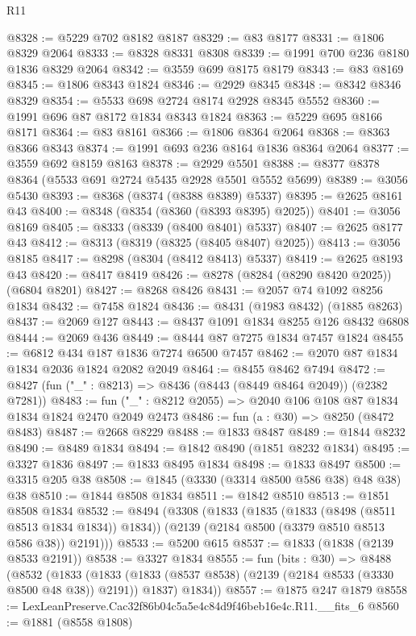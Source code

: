 \begin{lexlean}{R11}
\begin{coremodule}
@8328 := @5229 @702 @8182 @8187
@8329 := @83 @8177
@8331 := @1806 @8329 @2064
@8333 := @8328 @8331 @8308
@8339 := @1991 @700 @236 @8180 @1836 @8329 @2064
@8342 := @3559 @699 @8175 @8179
@8343 := @83 @8169
@8345 := @1806 @8343 @1824
@8346 := @2929 @8345
@8348 := @8342 @8346 @8329
@8354 := @5533 @698 @2724 @8174 @2928 @8345 @5552
@8360 := @1991 @696 @87 @8172 @1834 @8343 @1824
@8363 := @5229 @695 @8166 @8171
@8364 := @83 @8161
@8366 := @1806 @8364 @2064
@8368 := @8363 @8366 @8343
@8374 := @1991 @693 @236 @8164 @1836 @8364 @2064
@8377 := @3559 @692 @8159 @8163
@8378 := @2929 @5501
@8388 := @8377 @8378 @8364 (@5533 @691 @2724 @5435 @2928 @5501 @5552 @5699)
@8389 := @3056 @5430
@8393 := @8368 (@8374 (@8388 @8389) @5337)
@8395 := @2625 @8161 @43
@8400 := @8348 (@8354 (@8360 (@8393 @8395) @2025))
@8401 := @3056 @8169
@8405 := @8333 (@8339 (@8400 @8401) @5337)
@8407 := @2625 @8177 @43
@8412 := @8313 (@8319 (@8325 (@8405 @8407) @2025))
@8413 := @3056 @8185
@8417 := @8298 (@8304 (@8412 @8413) @5337)
@8419 := @2625 @8193 @43
@8420 := @8417 @8419
@8426 := @8278 (@8284 (@8290 @8420 @2025)) (@6804 @8201)
@8427 := @8268 @8426
@8431 := @2057 @74 @1092 @8256 @1834
@8432 := @7458 @1824
@8436 := @8431 (@1983 @8432) (@1885 @8263)
@8437 := @2069 @127
@8443 := @8437 @1091 @1834 @8255 @126 @8432 @6808
@8444 := @2069 @436
@8449 := @8444 @87 @7275 @1834 @7457 @1824
@8455 := @6812 @434 @187 @1836 @7274 @6500 @7457
@8462 := @2070 @87 @1834 @1834 @2036 @1824 @2082 @2049
@8464 := @8455 @8462 @7494
@8472 := @8427 (fun ("_" : @8213) => @8436 (@8443 (@8449 @8464 @2049)) (@2382 @7281))
@8483 := fun ("_" : @8212 @2055) => @2040 @106 @108 @87 @1834 @1834 @1824 @2470 @2049 @2473
@8486 := fun (a : @30) => @8250 (@8472 @8483)
@8487 := @2668 @8229
@8488 := @1833 @8487
@8489 := @1844 @8232
@8490 := @8489 @1834
@8494 := @1842 @8490 (@1851 @8232 @1834)
@8495 := @3327 @1836
@8497 := @1833 @8495 @1834
@8498 := @1833 @8497
@8500 := @3315 @205 @38
@8508 := @1845 (@3330 (@3314 @8500 @586 @38) @48 @38) @38
@8510 := @1844 @8508 @1834
@8511 := @1842 @8510
@8513 := @1851 @8508 @1834
@8532 := @8494
    (@3308
      (@1833
        (@1835 (@1833 (@8498 (@8511 @8513 @1834 @1834)) @1834))
        (@2139 (@2184 @8500 (@3379 @8510 @8513 @586 @38)) @2191)))
@8533 := @5200 @615
@8537 := @1833 (@1838 (@2139 @8533 @2191))
@8538 := @3327 @1834
@8555 := fun (bits : @30) =>
  @8488
    (@8532
      (@1833
        (@1833 (@1833 (@8537 @8538) (@2139 (@2184 @8533 (@3330 @8500 @48 @38)) @2191)) @1837)
        @1834))
@8557 := @1875 @247 @1879
@8558 := LexLeanPreserve.Cac32f86b04c5a5e4c84d9f46beb16e4c.R11.__fits_6
@8560 := @1881 (@8558 @1808)

\end{coremodule}
\end{lexlean}
